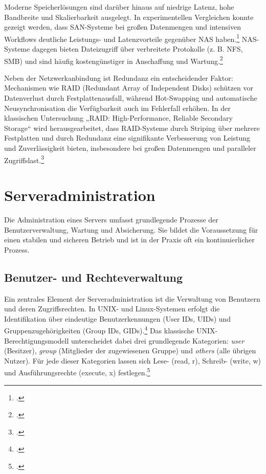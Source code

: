 \documentclass[12pt,a4paper]{report}
\begin{document}
Moderne Speicherlösungen sind darüber hinaus auf niedrige Latenz, hohe Bandbreite und Skalierbarkeit ausgelegt. 
In experimentellen Vergleichen konnte gezeigt werden, dass SAN-Systeme bei großen Datenmengen und intensiven Workflows deutliche Leistungs- 
und Latenzvorteile gegenüber NAS haben.\footcite[Vgl.][Abschnitt~IV; Ergebnisse]{jaikar2016performance}  
NAS-Systeme dagegen bieten Dateizugriff über verbreitete Protokolle (z. B. NFS, SMB) 
und sind häufig kostengünstiger in Anschaffung und Wartung.\footcite[Vgl.][S.~21857]{saravanamuthu2014study}


Neben der Netzwerkanbindung ist Redundanz ein entscheidender Faktor: Mechanismen 
wie RAID (Redundant Array of Independent Disks) schützen vor Datenverlust durch 
Festplattenausfall, während Hot-Swapping und automatische Neusynchronisation 
die Verfügbarkeit auch im Fehlerfall erhöhen. In der klassischen Untersuchung „RAID: 
High-Performance, Reliable Secondary Storage“ wird herausgearbeitet, dass RAID-Systeme durch Striping über mehrere Festplatten 
und durch Redundanz eine signifikante Verbesserung von Leistung und Zuverlässigkeit bieten, insbesondere bei großen Datenmengen 
und paralleler Zugriffslast.\footcite[Vgl.][151 ~ff.]{chen2004raid}

\section{Serveradministration}
Die Administration eines Servers umfasst grundlegende Prozesse der Benutzerverwaltung, Wartung und Absicherung. 
Sie bildet die Voraussetzung für einen stabilen und sicheren Betrieb und ist in der Praxis oft ein kontinuierlicher Prozess. %

  \subsection{Benutzer- und Rechteverwaltung}
  Ein zentrales Element der Serveradministration ist die Verwaltung von Benutzern und deren Zugriffsrechten. 
  In UNIX- und Linux-Systemen erfolgt die Identifikation über eindeutige Benutzerkennungen (User IDs, UIDs) 
  und Gruppenzugehörigkeiten (Group IDs, GIDs).\footcite[Vgl.][S.~176~ff.]{nemeth_unixlinux}
  Das klassische UNIX-Berechtigungsmodell unterscheidet dabei drei grundlegende Kategorien: 
  \emph{user} (Besitzer), \emph{group} (Mitglieder der zugewiesenen Gruppe) und \emph{others} (alle übrigen Nutzer). 
  Für jede dieser Kategorien lassen sich Lese- (read, r), Schreib- (write, w) und Ausführungsrechte (execute, x) festlegen.\footcite[Vgl.]{wikipedia_dateisystemrechte}
\end{document}
